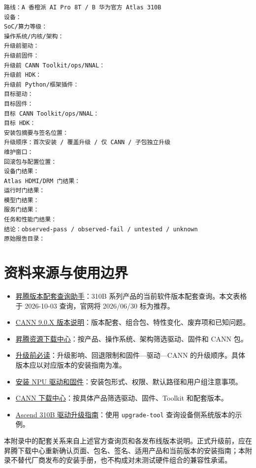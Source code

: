 \begin{lstlisting}
路线：A 香橙派 AI Pro 8T / B 华为官方 Atlas 310B
设备：
SoC/算力等级：
操作系统/内核/架构：
升级前驱动：
升级前固件：
升级前 CANN Toolkit/ops/NNAL：
升级前 HDK：
升级前 Python/框架插件：
目标驱动：
目标固件：
目标 CANN Toolkit/ops/NNAL：
目标 HDK：
安装包摘要与签名位置：
升级顺序：首次安装 / 覆盖升级 / 仅 CANN / 子包独立升级
维护窗口：
回滚包与配置位置：
设备门结果：
Atlas HDMI/DRM 门结果：
运行时门结果：
模型门结果：
服务门结果：
任务和性能门结果：
结论：observed-pass / observed-fail / untested / unknown
原始报告目录：
\end{lstlisting}

\section{资料来源与使用边界}\label{ux8d44ux6599ux6765ux6e90ux4e0eux4f7fux7528ux8fb9ux754c}

\begin{itemize}
\tightlist
\item
  \href{https://www.hiascend.com/developer/download/compatibility}{昇腾版本配套查询助手}：310B
  系列产品的当前软件版本配套查询。本文表格于 2026-10-03 查询，官网将
  2026/06/30 标为推荐。
\item
  \href{https://www.hiascend.com/document/detail/zh/CANNCommunityEdition/900/releasenote/release-notes.md}{CANN
  9.0.X 版本说明}：版本配套、组合包、特性变化、废弃项和已知问题。
\item
  \href{https://www.hiascend.com/developer/download/ascend-driver}{昇腾资源下载中心}：按产品、操作系统、架构筛选驱动、固件和
  CANN 包。
\item
  \href{https://www.hiascend.com/document/detail/zh/CANNCommunityEdition/83RC1/softwareinst/instg/instg_0028.html}{升级前必读}：升级影响、回退限制和固件---驱动---CANN
  的升级顺序。具体版本应以对应版本的安装指南为准。
\item
  \href{https://www.hiascend.com/document/detail/en/CANNCommunityEdition/900/softwareinst/instg/instg_0005.html?InstallType=local&Mode=PmIns&OS=Debian}{安装
  NPU 驱动和固件}：安装包形式、权限、默认路径和用户组注意事项。
\item
  \href{https://www.hiascend.com/cann/download}{CANN
  下载中心}：按具体产品筛选驱动、固件、Toolkit 和配套版本。
\item
  \href{https://www.hiascend.com/document/detail/zh/Atlas\%20200I\%20A2/24.1.RC1/EP/upgradeguide/upgrad_006.html}{Ascend
  310B 驱动升级指南}：使用 \passthrough{\lstinline!upgrade-tool!}
  查询设备侧系统版本的示例。
\end{itemize}

本附录中的配套关系来自上述官方查询页和各发布线版本说明。正式升级前，应在昇腾下载中心重新确认页面、包名、签名、适用产品和当前版本的安装指南；本附录不替代厂商发布的安装手册，也不构成对未测试硬件组合的兼容性承诺。
